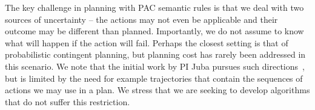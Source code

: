 \documentclass[12pt]{article}
\begin{document}
The key challenge in planning with PAC semantic rules is that
we deal with two sources of uncertainty -- the actions  may not even be applicable and their outcome may be different than planned. Importantly, we do not assume to know what will happen if the action will fail. Perhaps the closest setting is that of probabilistic contingent planning, but planning cost has rarely been addressed in this scenario. We note that the initial work by PI Juba pursues such directions~\cite{juba2016jmlr}, but is limited by the need for example trajectories that contain the sequences of actions we may use in a plan. We stress that we are seeking to develop algorithms that do not suffer this restriction.




\end{document}
